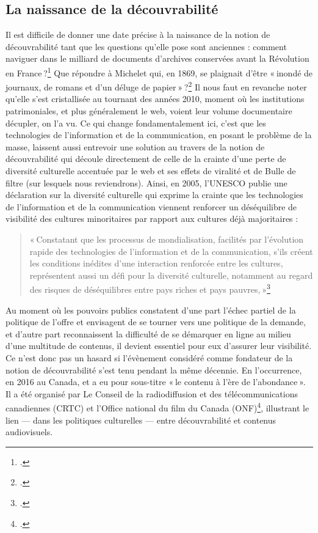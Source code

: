 \subsection{La naissance de la découvrabilité}

Il est difficile de donner une date précise à la naissance de la notion de découvrabilité tant que les questions qu’elle pose sont anciennes : comment naviguer dans le milliard de documents d’archives conservées avant la Révolution en France ?\footcite{poncet2022} Que répondre à Michelet qui, en 1869, se plaignait d’être « inondé de journaux, de romans et d’un déluge de papier » ?\footcite[p. 47]{bermes2024} Il nous faut en revanche noter qu’elle s’est cristallisée au tournant des années 2010, moment où les institutions patrimoniales, et plus généralement le web, voient leur volume documentaire décupler, on l’a vu. Ce qui change fondamentalement ici, c’est que les technologies de l’information et de la communication, en posant le problème de la masse, laissent aussi entrevoir une solution au travers de la notion de découvrabilité qui découle directement de celle de la crainte d’une perte de diversité culturelle accentuée par le web et ses effets de viralité et de Bulle de filtre (sur lesquels nous reviendrons). Ainsi, en 2005, l’UNESCO publie une déclaration sur la diversité culturelle qui exprime la crainte que les technologies de l’information et de la communication viennent renforcer un déséquilibre de visibilité des cultures minoritaires par rapport aux cultures déjà majoritaires :

\begin{quote}
	« Constatant que les processus de mondialisation, facilités par l’évolution rapide des technologies de l’information et de la communication, s’ils créent les conditions inédites d’une interaction renforcée entre les cultures, représentent aussi un défi pour la diversité culturelle, notamment au regard des risques de déséquilibres entre pays riches et pays pauvres, »\footcite{zotero-266}
\end{quote}

Au moment où les pouvoirs publics constatent d’une part l’échec partiel de la politique de l’offre et envisagent de se tourner vers une politique de la demande, et d’autre part reconnaissent la difficulté de se démarquer en ligne au milieu d’une multitude de contenus, il devient essentiel pour eux d’assurer leur visibilité. Ce n’est donc pas un hasard si l’évènement considéré comme fondateur de la notion de découvrabilité s’est tenu pendant la même décennie. En l’occurrence, en 2016 au Canada, et a eu pour sous-titre « le contenu à l’ère de l’abondance ». Il a été organisé par Le Conseil de la radiodiffusion et des télécommunications canadiennes (CRTC) et l’Office national du film du Canada (ONF)\footcite[Ironie du sort, le site orignellement lié au sommet est indisponible mais a été sauvegardé sur Internet Archive]{conseildelaradiodiffusionetdestelecommunicationscanadiennescrtcetlofficenationaldufilmducanadaonf2016}, illustrant le lien — dans les politiques culturelles — entre découvrabilité et contenus audiovisuels.

